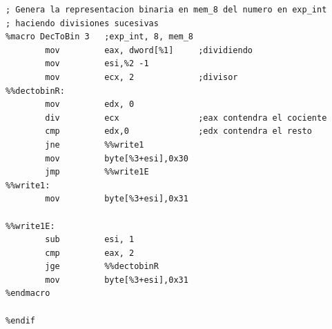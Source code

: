 \documentclass{article}
\begin{document}
\begin{verbatim}
; Genera la representacion binaria en mem_8 del numero en exp_int
; haciendo divisiones sucesivas
%macro DecToBin 3   ;exp_int, 8, mem_8
        mov         eax, dword[%1]     ;dividiendo
        mov         esi,%2 -1
        mov         ecx, 2             ;divisor
%%dectobinR:
        mov         edx, 0
        div         ecx                ;eax contendra el cociente
        cmp         edx,0              ;edx contendra el resto
        jne         %%write1
        mov         byte[%3+esi],0x30
        jmp         %%write1E
%%write1:
        mov         byte[%3+esi],0x31

%%write1E:
        sub         esi, 1
        cmp         eax, 2
        jge         %%dectobinR
        mov         byte[%3+esi],0x31
%endmacro

%endif

	\end{verbatim}
	
\end{document}
